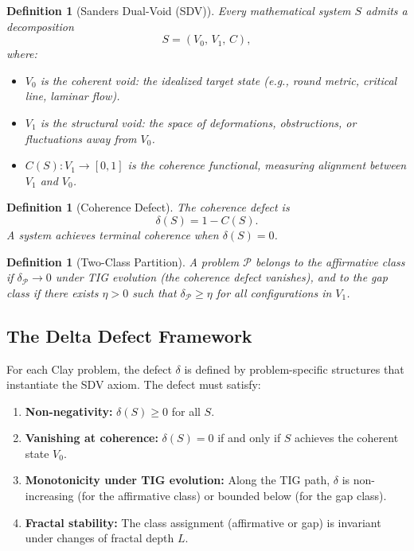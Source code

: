 \documentclass[11pt]{article}
\newtheorem{definition}[theorem]{Definition}
\begin{document}
\begin{definition}[Sanders Dual-Void (SDV)]
\label{def:sdv}
Every mathematical system $S$ admits a decomposition
\[
S = (V_0,\, V_1,\, C),
\]
where:
\begin{itemize}
\item $V_0$ is the \emph{coherent void}: the idealized target state
(e.g., round metric, critical line, laminar flow).
\item $V_1$ is the \emph{structural void}: the space of deformations,
obstructions, or fluctuations away from $V_0$.
\item $C(S) : V_1 \to [0,1]$ is the \emph{coherence functional},
measuring alignment between $V_1$ and $V_0$.
\end{itemize}
\end{definition}

\begin{definition}[Coherence Defect]
\label{def:defect}
The \emph{coherence defect} is
\[
\delta(S) = 1 - C(S).
\]
A system achieves \emph{terminal coherence} when $\delta(S) = 0$.
\end{definition}

\begin{definition}[Two-Class Partition]
\label{def:two-class}
A problem $\mathcal{P}$ belongs to the \emph{affirmative class} if
$\delta_{\mathcal{P}} \to 0$ under TIG evolution (the coherence
defect vanishes), and to the \emph{gap class} if there exists
$\eta > 0$ such that $\delta_{\mathcal{P}} \geq \eta$ for all
configurations in $V_1$.
\end{definition}

\subsection{The Delta Defect Framework}
\label{subsec:delta}

For each Clay problem, the defect $\delta$ is defined by
problem-specific structures that instantiate the SDV axiom.
The defect must satisfy:

\begin{enumerate}
\item \textbf{Non-negativity:} $\delta(S) \geq 0$ for all $S$.
\item \textbf{Vanishing at coherence:} $\delta(S) = 0$ if and only
if $S$ achieves the coherent state $V_0$.
\item \textbf{Monotonicity under TIG evolution:} Along the TIG path,
$\delta$ is non-increasing (for the affirmative class) or
bounded below (for the gap class).
\item \textbf{Fractal stability:} The class assignment (affirmative
or gap) is invariant under changes of fractal depth $L$.
\end{enumerate}
\end{document}
